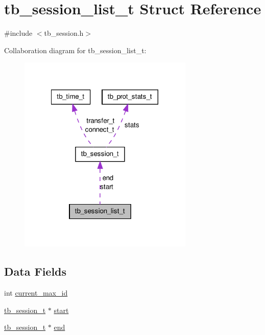 \hypertarget{structtb__session__list__t}{\section{tb\-\_\-session\-\_\-list\-\_\-t Struct Reference}
\label{structtb__session__list__t}
}


{\ttfamily \#include $<$tb\-\_\-session.\-h$>$}



Collaboration diagram for tb\-\_\-session\-\_\-list\-\_\-t\-:\nopagebreak
\begin{figure}[H]
\begin{center}
\leavevmode
\includegraphics[width=236pt]{structtb__session__list__t__coll__graph}
\end{center}
\end{figure}
\subsection*{Data Fields}
\begin{DoxyCompactItemize}
\item 
int \hyperlink{structtb__session__list__t_a07d174b6514e5b02a3aa97ddc357d062}{current\-\_\-max\-\_\-id}
\item 
\hyperlink{structtb__session__t}{tb\-\_\-session\-\_\-t} $\ast$ \hyperlink{structtb__session__list__t_ae4ef1c5e563343eb946a3fe31c28be31}{start}
\item 
\hyperlink{structtb__session__t}{tb\-\_\-session\-\_\-t} $\ast$ \hyperlink{structtb__session__list__t_aab7b6dca3cae04438a12695d690d54c7}{end}
\end{DoxyCompactItemize}


